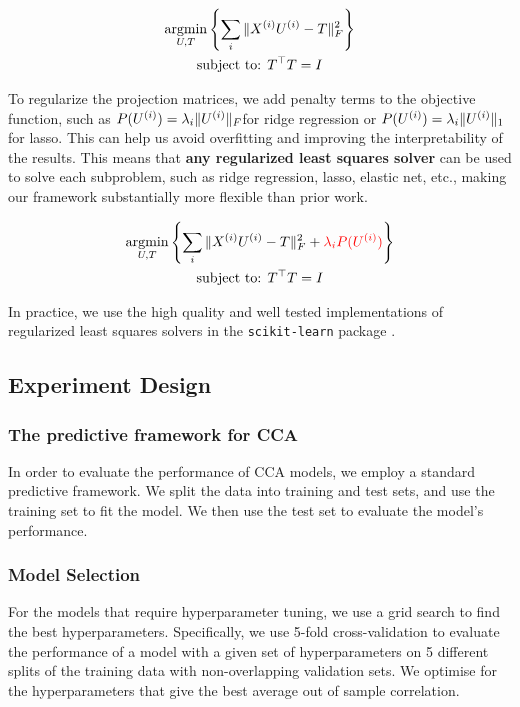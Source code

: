 \begin{gather*}
    \underset{U, T}{\mathrm{argmin}}\left\{\sum_i \|X^{(i)} U^{(i)} - T\|_F^2 \right\}\\
    \text{subject to: }T^\top T = I\\
\end{gather*}

To regularize the projection matrices, we add penalty terms to the objective function, such as \( P(U^{(i)}) = \lambda_i \|U^{(i)}\|_F \)for ridge regression or \( P(U^{(i)}) = \lambda_i \|U^{(i)}\|_1 \) for lasso.
This can help us avoid overfitting and improving the interpretability of the results.
This means that \textbf{any regularized least squares solver} can be used to solve each subproblem, such as ridge regression, lasso, elastic net, etc., making our framework substantially more flexible than prior work.

\begin{gather*}
    \underset{U, T}{\mathrm{argmin}}\left\{\sum_i \|X^{(i)} U^{(i)} - T\|_F^2 + \textcolor{red}{\lambda_i P(U^{(i)})}\right\}\\
    \text{subject to: }T^\top T = I\\
\end{gather*}

In practice, we use the high quality and well tested implementations of regularized least squares solvers in the \texttt{scikit-learn} package \cite{pedregosa2011scikit}.

\subsection{Experiment Design}

\subsubsection{The predictive framework for CCA}

In order to evaluate the performance of CCA models, we employ a standard predictive framework.
We split the data into training and test sets, and use the training set to fit the model.
We then use the test set to evaluate the model's performance.

\subsubsection{Model Selection}

For the models that require hyperparameter tuning, we use a grid search to find the best hyperparameters.
Specifically, we use 5-fold cross-validation to evaluate the performance of a model with a given set of
hyperparameters on 5 different splits of the training data with non-overlapping validation sets. We optimise for the
hyperparameters that give the best average out of sample correlation.

